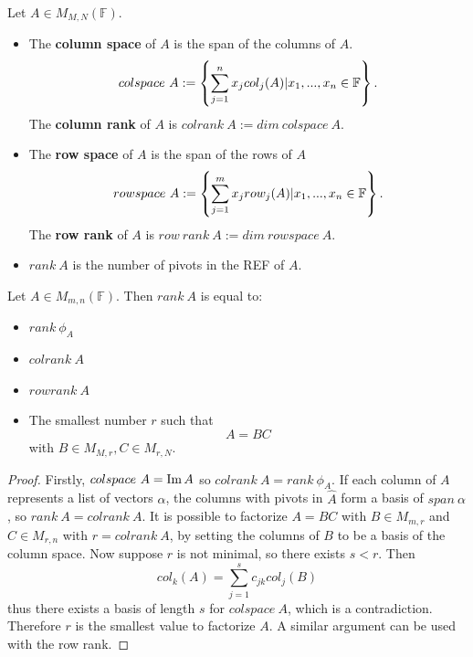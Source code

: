 \begin{definition} Let $A \in M_{M,N}(\mathbb{F})$.
  \begin{itemize}
    \item The {\bf column space} of $A$ is the span of the columns of $A$.
      \[colspace \ A := \left\{\sum_{j=1}^n x_j col_j(A) \\ | \\ x_1,...,x_n \in \mathbb{F}\right\}.\]
    The {\bf column rank} of $A$ is $colrank \ A := dim \ colspace \ A$.

    \item The {\bf row space} of $A$ is the span of the rows of $A$
      \[rowspace \ A := \left\{\sum_{j=1}^m x_j row_j(A) \\ | \\ x_1,...,x_n \in \mathbb{F}\right\}.\]
      The {\bf row rank} of $A$ is $row \ rank \ A := dim \ rowspace \ A$.
    \item $rank \ A$ is the number of pivots in the REF of $A$.
      
  \end{itemize}

\end{definition}

\begin{theorem}
  Let $A \in M_{m,n}(\mathbb{F})$. Then $rank \ A$ is equal to:
  \begin{itemize}
    \item $rank \ \phi_A$
    \item $colrank \ A$
    \item $rowrank \ A$
    \item The smallest number $r$ such that
      \[A = BC\]
      with $B \in M_{M, r}, C \in M_{r, N}$.
  \end{itemize}
\end{theorem}
\begin{proof}
  Firstly, $colspace \ A = \operatorname{Im} A$ so $colrank \ A = rank \ \phi_A$. If each column of $A$ represents a list of vectors $\alpha$, the columns with pivots in $\hat{A}$ form a basis of $span \ \alpha$, so $rank \ A = colrank \ A$. It is possible to factorize $A = BC$ with $B \in M_{m,r}$ and $C \in M_{r,n}$ with $r = colrank \ A$, by setting the columns of $B$ to be a basis of the column space. Now suppose $r$ is not minimal, so there exists $s < r$. Then \[col_k(A) = \sum_{ j = 1}^{s} c_{jk}col_j(B)\]
  thus there exists a basis of length $s$ for $colspace \ A$, which is a contradiction. Therefore $r$ is the smallest value to factorize $A$. A similar argument can be used with the row rank.
\end{proof}

